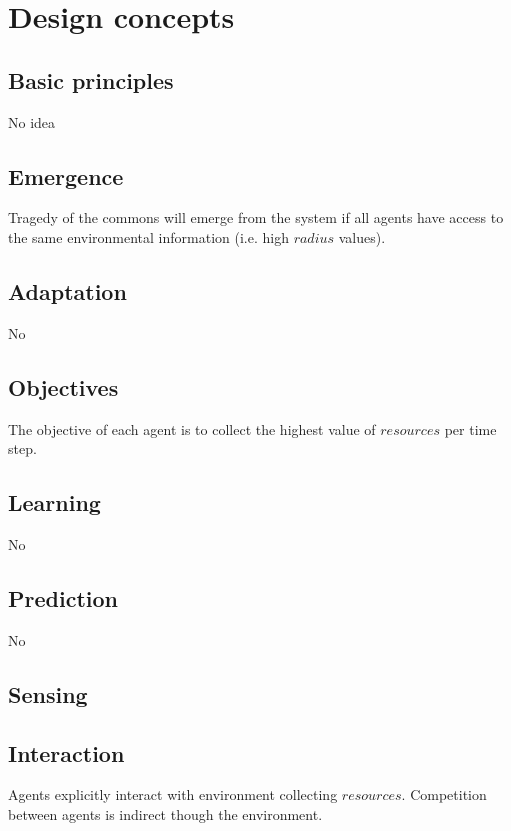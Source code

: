 \documentclass[11pt,a4paper,twocolumn,notitlepage]{article}
\begin{document}
\section{Design concepts}

\subsection{Basic principles}

No idea

\subsection{Emergence}

Tragedy of the commons will emerge from the system if all agents have access to the same environmental information (i.e. high $radius$ values).

\subsection{Adaptation}

No

\subsection{Objectives}

The objective of each agent is to collect the highest value of $resources$ per time step.

\subsection{Learning}

No

\subsection{Prediction}

No

\subsection{Sensing}

\subsection{Interaction}

Agents explicitly interact with environment collecting $resources$. Competition between agents is indirect though the environment.
\end{document}
